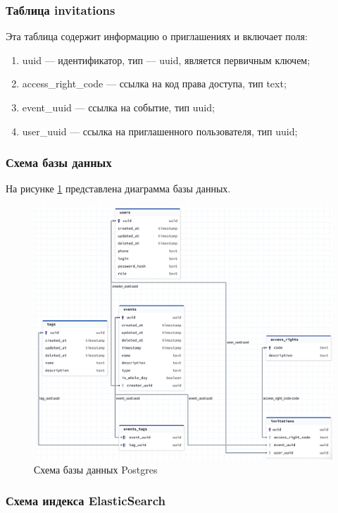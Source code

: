\subsubsection{Таблица invitations}

Эта таблица содержит информацию о приглашениях и включает поля:

\begin{enumerate}[label=\arabic*.]
	\item uuid --- идентификатор, тип --- uuid, является первичным ключем;
	\item access\_right\_code --- ссылка на код права доступа, тип text;
	\item event\_uuid --- ссылка на событие, тип uuid;
	\item user\_uuid --- ссылка на приглашенного пользователя, тип uuid;
\end{enumerate}

\subsubsection{Схема базы данных}

На рисунке \ref{fig:DB} представлена диаграмма базы данных.

\begin{figure}[ht!]
	\centering
	\includegraphics[width=0.9\linewidth]{assets/images/DB.png}
	\caption{Схема базы данных Postgres}
	\label{fig:DB}
\end{figure}
\FloatBarrier

\subsubsection{Схема индекса ElasticSearch}

